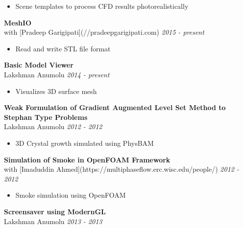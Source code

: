 \documentclass{res}
\begin{document}
\begin{resume}
\begin{itemize}[leftmargin=*]
	\item Scene templates to process CFD results photorealistically
	\end{itemize}
	
	{\bf MeshIO} \\
	with [Pradeep Garigipati](//pradeepgarigipati.com) \hfill {\it 2015 - present}
	\begin{itemize}[leftmargin=*]
	\setlength{\itemsep}{0mm} \smallskip
	
	\item Read and write STL file format
	\end{itemize}
	
	{\bf Basic Model Viewer} \\
	Lakshman Anumolu \hfill {\it 2014 - present}
	\begin{itemize}[leftmargin=*]
	\setlength{\itemsep}{0mm} \smallskip
	
	\item Visualizes 3D surface mesh
	\end{itemize}
	
	{\bf Weak Formulation of Gradient Augmented Level Set Method to Stephan Type Problems} \\
	Lakshman Anumolu \hfill {\it 2012 - 2012}
	\begin{itemize}[leftmargin=*]
	\setlength{\itemsep}{0mm} \smallskip
	
	\item 3D Crystal growth simulated using PhysBAM
	\end{itemize}
	
	{\bf Simulation of Smoke in OpenFOAM Framework} \\
	with [Imaduddin Ahmed](https://multiphaseflow.erc.wisc.edu/people/) \hfill {\it 2012 - 2012}
	\begin{itemize}[leftmargin=*]
	\setlength{\itemsep}{0mm} \smallskip
	
	\item Smoke simulation using OpenFOAM
	\end{itemize}
	
	{\bf Screensaver using ModernGL} \\
	Lakshman Anumolu \hfill {\it 2013 - 2013}
	\begin{itemize}[leftmargin=*]
	\setlength{\itemsep}{0mm} \smallskip
	

\end{itemize}
\end{resume}
\end{document}

